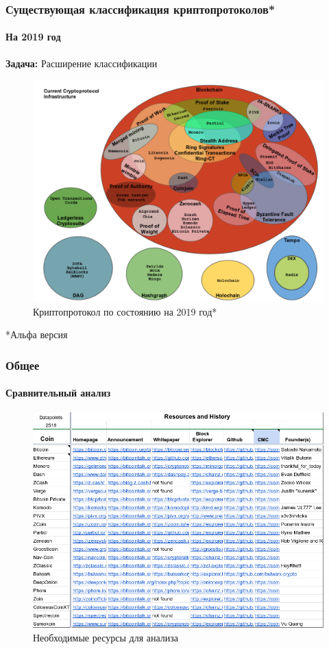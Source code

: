 \documentclass{beamer}
\begin{document}
\begin{frame}
    \frametitle{Существующая классификация криптопротоколов*}
    \framesubtitle{На 2019 год}
    \textbf{Задача: } Расширение классификации

    \begin{figure}
        \includegraphics[width=0.65\columnwidth]{myprotocol_w_title.png}
        \caption{Криптопротокол по состоянию на 2019 год*}
    \end{figure}
    \begin{flushright}
        \vspace{-0.5cm}
        \tiny
        *Альфа версия
    \end{flushright}
\end{frame}

\begin{frame}
    \frametitle{Общее}
    \framesubtitle{Сравнительный анализ}
    \begin{figure}
        \includegraphics[width=0.79\columnwidth]{sravn1.png}
        \caption{Необходимые ресурсы для анализа}
    \end{figure}
\end{frame}
\end{document}
